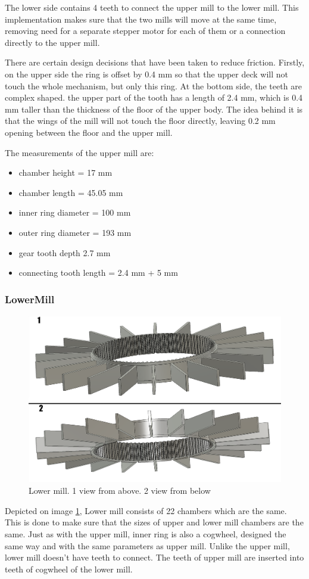 The lower side contains 4 teeth to connect the upper mill to the lower mill. This implementation makes sure that the two mills will move at the same time, removing need for a separate stepper motor for each of them or a connection directly to the upper mill.

There are certain design decisions that have been taken to reduce friction. Firstly, on the upper side the ring is offset by 0.4 mm so that the upper deck will not touch the whole mechanism, but only this ring. At the bottom side, the teeth are complex shaped. the upper part of the tooth has a length of 2.4 mm, which is 0.4 mm taller than the thickness of the floor of the upper body. The idea behind it is that the wings of the mill will not touch the floor directly, leaving 0.2 mm opening between the floor and the upper mill.
 
The measurements of the upper mill are:
\begin{itemize}
	\item chamber height = 17 mm
	\item chamber length = 45.05 mm
	\item inner ring diameter = 100 mm
	\item outer ring diameter = 193 mm
	\item gear tooth depth 2.7 mm
	\item connecting tooth length = 2.4 mm + 5 mm
\end{itemize}
\newpage
\subsubsection{LowerMill}
\begin{figure}[h]
	\centering
	\includegraphics[width=0.7\linewidth]{Figures/Lowermill}
	\caption[Lower Mill]{Lower mill. 1 view from above. 2 view from below}
	\label{fig:lowermill}
\end{figure}
Depicted on image \ref{fig:lowermill}, Lower mill consists of 22 chambers which are the same. This is done to make sure that the sizes of upper and lower mill chambers are the same. Just as with the upper mill, inner ring is also a cogwheel, designed the same way and with the same parameters as upper mill. Unlike the upper mill, lower mill doesn't have teeth to connect. The teeth of upper mill are inserted into teeth of cogwheel of the lower mill.

